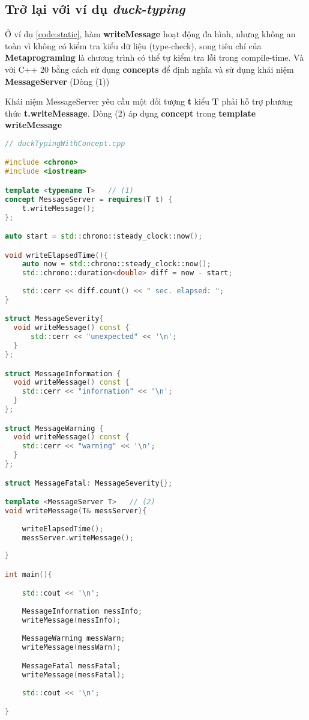\subsection{Trở lại với ví dụ \textit{duck-typing}}

Ở ví dụ \ref{code:static}, hàm \textbf{writeMessage} hoạt động đa hình, nhưng không an toàn vì không có kiểm tra kiểu dữ liệu (type-check), song tiêu chí của \textbf{Metaprograming} là chương trình có thể tự kiểm tra lỗi trong compile-time. Và với C++ 20 bằng cách sử dụng \textbf{concepts} để định nghĩa và sử dụng khái niệm \textbf{MessageServer} (Dòng (1))

Khái niệm MessageServer yêu cầu một đối tượng \textbf{t} kiểu \textbf{T} phải hỗ trợ phương thức \textbf{t.writeMessage}. Dòng (2) áp dụng \textbf{concept} trong \textbf{template writeMessage}

\begin{lstlisting}[caption={Concept trong Duck-typing},label={code:concept},language=C++]
// duckTypingWithConcept.cpp

#include <chrono>
#include <iostream>

template <typename T>   // (1)
concept MessageServer = requires(T t) {
    t.writeMessage();
};

auto start = std::chrono::steady_clock::now();

void writeElapsedTime(){
    auto now = std::chrono::steady_clock::now();
    std::chrono::duration<double> diff = now - start;
  
    std::cerr << diff.count() << " sec. elapsed: ";
}

struct MessageSeverity{
  void writeMessage() const {
      std::cerr << "unexpected" << '\n';
  }
};

struct MessageInformation {
  void writeMessage() const {              
    std::cerr << "information" << '\n';
  }
};

struct MessageWarning {
  void writeMessage() const {               
    std::cerr << "warning" << '\n';
  }
};

struct MessageFatal: MessageSeverity{};     

template <MessageServer T>   // (2)
void writeMessage(T& messServer){                       
	
	writeElapsedTime();                                   
	messServer.writeMessage();                            
	
}

int main(){

    std::cout << '\n';
  
    MessageInformation messInfo;
    writeMessage(messInfo);
    
    MessageWarning messWarn;
    writeMessage(messWarn);

    MessageFatal messFatal;
    writeMessage(messFatal);
  
    std::cout << '\n';

}
 
\end{lstlisting}
